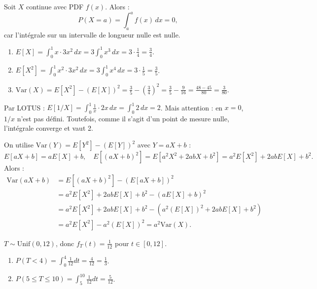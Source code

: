 \begin{correctionbox}[Exercice 4 :]
Soit $X$ continue avec PDF $f(x)$. Alors :
\[
P(X = a) = \int_a^a f(x)\,dx = 0,
\]
car l'intégrale sur un intervalle de longueur nulle est nulle.

\end{correctionbox}

\begin{correctionbox}[Exercice 5 :]
\begin{enumerate}
    \item $E[X] = \int_0^1 x \cdot 3x^2 \, dx = 3 \int_0^1 x^3 \, dx = 3 \cdot \frac{1}{4} = \frac{3}{4}$.
    
    \item $E[X^2] = \int_0^1 x^2 \cdot 3x^2 \, dx = 3 \int_0^1 x^4 \, dx = 3 \cdot \frac{1}{5} = \frac{3}{5}$.
    
    \item $\text{Var}(X) = E[X^2] - (E[X])^2 = \frac{3}{5} - \left(\frac{3}{4}\right)^2 = \frac{3}{5} - \frac{9}{16} = \frac{48 - 45}{80} = \frac{3}{80}$.
\end{enumerate}
\end{correctionbox}

\begin{correctionbox}[Exercice 6 :]
Par LOTUS : $E[1/X] = \int_0^1 \frac{1}{x} \cdot 2x \, dx = \int_0^1 2 \, dx = 2$.
Mais attention : en $x=0$, $1/x$ n'est pas défini. Toutefois, comme il s'agit d'un point de mesure nulle, l'intégrale converge et vaut 2.

\end{correctionbox}

\begin{correctionbox}[Exercice 7 :]
On utilise $\text{Var}(Y) = E[Y^2] - (E[Y])^2$ avec $Y = aX + b$ :
\[
E[aX + b] = aE[X] + b, \quad E[(aX + b)^2] = E[a^2X^2 + 2abX + b^2] = a^2E[X^2] + 2abE[X] + b^2.
\]
Alors :
\begin{align*}
\text{Var}(aX + b) &= E[(aX + b)^2] - (E[aX + b])^2 \\
&= a^2E[X^2] + 2abE[X] + b^2 - (aE[X] + b)^2 \\
&= a^2E[X^2] + 2abE[X] + b^2 - \left(a^2(E[X])^2 + 2abE[X] + b^2\right) \\
&= a^2E[X^2] - a^2(E[X])^2 = a^2 \text{Var}(X).
\end{align*}
\end{correctionbox}

\begin{correctionbox}[Exercice 8 :]
$T \sim \text{Unif}(0, 12)$, donc $f_T(t) = \frac{1}{12}$ pour $t \in [0,12]$.
\begin{enumerate}
    \item $P(T < 4) = \int_0^4 \frac{1}{12} dt = \frac{4}{12} = \frac{1}{3}$.
    \item $P(5 \le T \le 10) = \int_5^{10} \frac{1}{12} dt = \frac{5}{12}$.
\end{enumerate}
\end{correctionbox}

